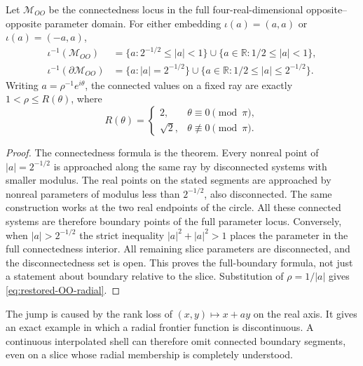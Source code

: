 \begin{corollary}
\label{cor:restored-OO-frontier}
Let $\mathcal M_{OO}$ be the connectedness locus in the full
four-real-dimensional opposite--opposite parameter domain. For
either embedding $\iota(a)=(a,a)$ or $\iota(a)=(-a,a)$,
\begin{align}
 \iota^{-1}(\mathcal M_{OO})
   &=\{a:2^{-1/2}\le|a|<1\}
     \cup\{a\in\mathbb R:1/2\le|a|<1\},
       \label{eq:restored-OO-connectedness}\\
 \iota^{-1}(\partial\mathcal M_{OO})
   &=\{a:|a|=2^{-1/2}\}
     \cup\{a\in\mathbb R:1/2\le|a|\le2^{-1/2}\}.
       \label{eq:restored-OO-fullboundary}
\end{align}
Writing $a=\rho^{-1}e^{i\theta}$, the connected values on a fixed ray
are exactly $1<\rho\le R(\theta)$, where
\begin{equation}\label{eq:restored-OO-radial}
 R(\theta)=
 \begin{cases}
 2,&\theta\equiv0\pmod\pi,\\
 \sqrt2,&\theta\not\equiv0\pmod\pi.
 \end{cases}
\end{equation}
\end{corollary}

\begin{proof}
The connectedness formula is the theorem. Every nonreal point of
$|a|=2^{-1/2}$ is approached along the same ray by disconnected
systems with smaller modulus. The real points on the stated
segments are approached by nonreal parameters of modulus less than
$2^{-1/2}$, also disconnected. The same construction works at the
two real endpoints of the circle. All these connected systems are
therefore boundary points of the full parameter locus.
Conversely, when $|a|>2^{-1/2}$ the strict inequality
$|a|^2+|a|^2>1$ places the parameter in the full connectedness
interior. All remaining slice parameters are disconnected, and
the disconnectedness set is open. This proves the full-boundary
formula, not just a statement about boundary relative to the slice.
Substitution of $\rho=1/|a|$ gives \eqref{eq:restored-OO-radial}.
\end{proof}

The jump is caused by the rank loss of $(x,y)\mapsto x+ay$ on the
real axis. It gives an exact example in which a radial frontier
function is discontinuous. A continuous interpolated shell can
therefore omit connected boundary segments, even on a slice whose
radial membership is completely understood.

